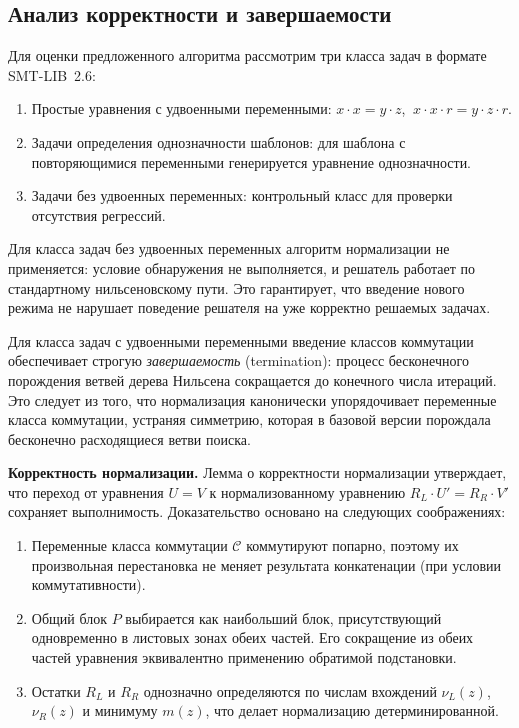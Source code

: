 \documentclass[14pt, russian]{scrartcl}
\begin{document}
\subsection{Анализ корректности и завершаемости}

Для оценки предложенного алгоритма рассмотрим три класса задач в формате
SMT-LIB~2.6:

\begin{enumerate}
\item Простые уравнения с удвоенными переменными:
  $x \cdot x = y \cdot z$, $\ x \cdot x \cdot r = y \cdot z \cdot r$.
\item Задачи определения однозначности шаблонов: для шаблона с повторяющимися
  переменными генерируется уравнение однозначности.
\item Задачи без удвоенных переменных: контрольный класс для проверки
  отсутствия регрессий.
\end{enumerate}

Для класса задач без удвоенных переменных алгоритм нормализации не применяется:
условие обнаружения не выполняется, и решатель работает по стандартному
нильсеновскому пути. Это гарантирует, что введение нового режима не нарушает
поведение решателя на уже корректно решаемых задачах.

Для класса задач с удвоенными переменными введение классов коммутации обеспечивает
строгую \emph{завершаемость} (termination): процесс бесконечного порождения ветвей
дерева Нильсена сокращается до конечного числа итераций. Это следует из того,
что нормализация канонически упорядочивает переменные класса коммутации,
устраняя симметрию, которая в базовой версии порождала бесконечно расходящиеся
ветви поиска.

\medskip\noindent\textbf{Корректность нормализации.}
Лемма о корректности нормализации утверждает, что переход от уравнения $U = V$
к нормализованному уравнению $R_L \cdot U' = R_R \cdot V'$ сохраняет выполнимость.
Доказательство основано на следующих соображениях:
\begin{enumerate}
\item Переменные класса коммутации $\mathcal{C}$ коммутируют попарно, поэтому
  их произвольная перестановка не меняет результата конкатенации (при условии
  коммутативности).
\item Общий блок $P$ выбирается как наибольший блок, присутствующий одновременно
  в листовых зонах обеих частей. Его сокращение из обеих частей уравнения
  эквивалентно применению обратимой подстановки.
\item Остатки $R_L$ и $R_R$ однозначно определяются по числам вхождений
  $\nu_L(z)$, $\nu_R(z)$ и минимуму $m(z)$, что делает нормализацию детерминированной.
\end{enumerate}
\end{document}
